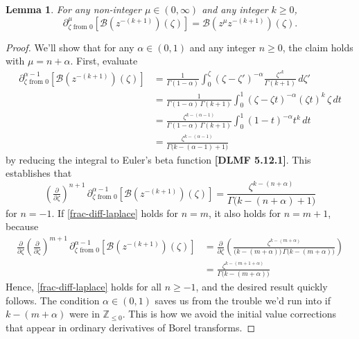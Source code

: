 \documentclass{article}
\newcommand{\Z}{\mathbb{Z}}
\newcommand{\borel}{\mathcal{B}}
\newtheorem{lemma}[definition]{Lemma}
\begin{document}
\begin{lemma}\label{lem:frac-deriv-Borel}
For any non-integer $\mu \in (0, \infty)$ and any integer $k \ge 0$,
\[ \partial^\mu_{\zeta \text{ from } 0} \left[ \borel \left(z^{-(k+1)}\right)(\zeta) \right] =  \borel \left(z^\mu z^{-(k+1)}\right)(\zeta). \]
\end{lemma}
\begin{proof}
We'll show that for any $\alpha \in (0, 1)$ and any integer $n \ge 0$, the claim holds with $\mu = n + \alpha$. First, evaluate
\begin{align*}
\partial^{\alpha-1}_{\zeta \text{ from } 0} \left[ \borel \left(z^{-(k+1)}\right)(\zeta) \right] & = \frac{1}{\Gamma(1-\alpha)} \int_0^\zeta (\zeta-\zeta')^{-\alpha} \frac{{\zeta'}^k}{\Gamma(k+1)}\,d\zeta' \\
& = \frac{1}{\Gamma(1-\alpha)\,\Gamma(k+1)} \int_0^1 (\zeta-\zeta t)^{-\alpha} (\zeta t)^k\,\zeta\,dt \\
& = \frac{\zeta^{k-(\alpha-1)}}{\Gamma(1-\alpha)\,\Gamma(k+1)} \int_0^1 (1-t)^{-\alpha} t^k\,dt \\
& = \frac{\zeta^{k-(\alpha-1)}}{\Gamma\big(k-(\alpha-1)+1\big)}
\end{align*}
by reducing the integral to Euler's beta function \textbf{[DLMF 5.12.1]}. This establishes that
\begin{equation}\label{frac-diff-laplace}
\left(\tfrac{\partial}{\partial \zeta}\right)^{n+1}\,\partial^{\alpha-1}_{\zeta \text{ from } 0} \left[ \borel \left(z^{-(k+1)}\right)(\zeta) \right] = \frac{\zeta^{k-(n+\alpha)}}{\Gamma\big(k-(n+\alpha)+1\big)}
\end{equation}
for $n = -1$. If \eqref{frac-diff-laplace} holds for $n = m$, it also holds for $n = m+1$, because
\begin{align*}
\tfrac{\partial}{\partial \zeta} \left(\tfrac{\partial}{\partial \zeta}\right)^{m+1}\,\partial^{\alpha-1}_{\zeta \text{ from } 0} \left[ \borel \left(z^{-(k+1)}\right)(\zeta) \right] & = \tfrac{\partial}{\partial \zeta} \left( \frac{\zeta^{k-(m+\alpha)}}{\big(k-(m+\alpha)\big)\,\Gamma\big(k-(m+\alpha)\big)} \right) \\
& = \frac{\zeta^{k-(m+1+\alpha)}}{\Gamma\big(k-(m+\alpha)\big)}
\end{align*}
Hence, \eqref{frac-diff-laplace} holds for all $n \ge -1$, and the desired result quickly follows. The condition $\alpha \in (0, 1)$ saves us from the trouble we'd run into if $k-(m+\alpha)$ were in $\Z_{\le 0}$. This is how we avoid the initial value corrections that appear in ordinary derivatives of Borel transforms.
\end{proof}
\end{document}
